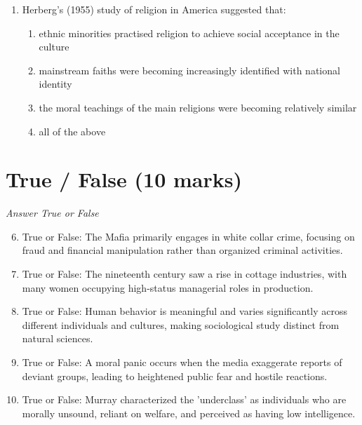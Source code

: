 \documentclass[12pt]{article}
\begin{document}
\begin{enumerate}[label=\arabic*.]
\begin{enumerate}[label=(\alph*)]
    \item schools prepare children for work by teaching them to be obedient
    \item teachers and parents tend to have similar attitudes to learning
    \item children who write lots of letters develop a better grasp of language
    \item boys' and girls' educational achievements have recently become similar
\end{enumerate}
\item Herberg's (1955) study of religion in America suggested that:
\begin{enumerate}[label=(\alph*)]
    \item ethnic minorities practised religion to achieve social acceptance in the culture
    \item mainstream faiths were becoming increasingly identified with national identity
    \item the moral teachings of the main religions were becoming relatively similar
    \item all of the above
\end{enumerate}
\end{enumerate}

\section*{True / False (10 marks)}
\textit{Answer True or False}
\begin{enumerate}[label=\arabic*.]
\setcounter{enumi}{5}
\item True or False: The Mafia primarily engages in white collar crime, focusing on fraud and financial manipulation rather than organized criminal activities.
\item True or False: The nineteenth century saw a rise in cottage industries, with many women occupying high-status managerial roles in production.
\item True or False: Human behavior is meaningful and varies significantly across different individuals and cultures, making sociological study distinct from natural sciences.
\item True or False: A moral panic occurs when the media exaggerate reports of deviant groups, leading to heightened public fear and hostile reactions.
\item True or False: Murray characterized the 'underclass' as individuals who are morally unsound, reliant on welfare, and perceived as having low intelligence.
\end{enumerate}
\end{document}
